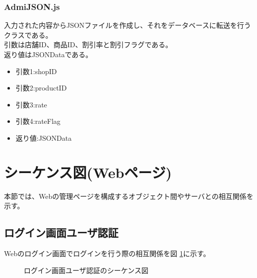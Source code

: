 \documentclass[a4j]{jarticle}
\begin{document}
	\subsubsection{AdmiJSON.js}
入力された内容からJSONファイルを作成し、それをデータベースに転送を行うクラスである。\\
引数は店舗ID、商品ID、割引率と割引フラグである。\\
返り値はJSONDataである。
	\begin{itemize}
		\item 引数1:shopID
		\item 引数2:productID
		\item 引数3:rate
		\item 引数4:rateFlag
	\end{itemize}
	\begin{itemize}
		\item 返り値:JSONData
	\end{itemize}
\section{シーケンス図(Webページ)}
本節では、Webの管理ページを構成するオブジェクト間やサーバとの相互関係を示す。

\subsection{ログイン画面ユーザ認証}
Webのログイン画面でログインを行う際の相互関係を図 \ref {tab:oonishi1}に示す。
\begin{figure}[H]
\begin{center}
\caption{ログイン画面ユーザ認証のシーケンス図}
\label{tab:oonishi1}
\end{center}
\end{figure}　　
\end{document}
